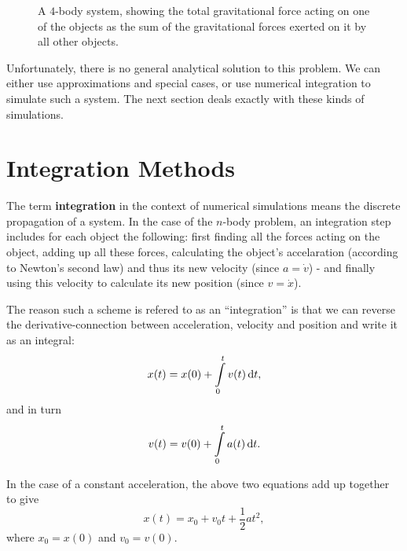\begin{figure}
	\begin{center}
	\end{center}
	\caption{A $4$-body system, showing the total gravitational force acting on one of the objects as the sum of the gravitational forces exerted on it by all other objects.}
	\label{fig:4_body_system}
\end{figure}

Unfortunately, there is no general analytical solution to this problem. We can either use approximations and special cases, or use numerical integration to simulate such a system. The next section deals exactly with these kinds of simulations.

\section{Integration Methods}
The term \textbf{integration} in the context of numerical simulations means the discrete propagation of a system. In the case of the $n$-body problem, an integration step includes for each object the following: first finding all the forces acting on the object, adding up all these forces, calculating the object's accelaration (according to Newton's second law) and thus its new velocity (since $a=\dot{v}$) - and finally using this velocity to calculate its new position (since $v=\dot{x}$).

The reason such a scheme is refered to as an \enquote{integration} is that we can reverse the derivative-connection between acceleration, velocity and position and write it as an integral:
\begin{equation}
	x(t) = x(0) + \int\limits_{0}^{t}v(t)\dif t,
	\label{eq:position_from_velocity}
\end{equation}
and in turn
\begin{equation}
	v(t) = v(0) + \int\limits_{0}^{t}a(t)\dif t.
	\label{eq:velocity_from_accelration}
\end{equation}

In the case of a constant acceleration, the above two equations add up together to give
\begin{equation}
	x(t) = x_{0} + v_{0}t + \frac{1}{2}at^{2},
	\label{eq:position_from_constant_acceleration}
\end{equation}
where $x_{0}=x(0)$ and $v_{0}=v(0)$.

